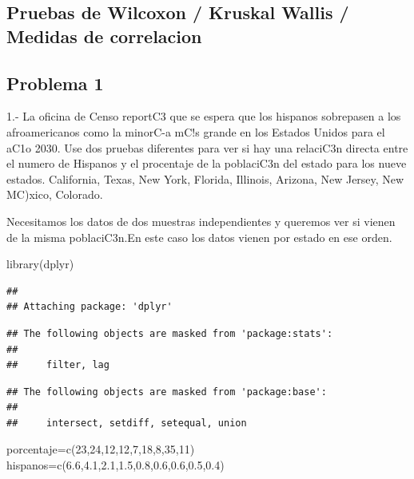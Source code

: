 \documentclass[
]{article}
\newenvironment{Shaded}{\begin{snugshade}}{\end{snugshade}}
\newcommand{\DecValTok}[1]{\textcolor[rgb]{0.00,0.00,0.81}{#1}}
\newcommand{\FloatTok}[1]{\textcolor[rgb]{0.00,0.00,0.81}{#1}}
\newcommand{\FunctionTok}[1]{\textcolor[rgb]{0.00,0.00,0.00}{#1}}
\newcommand{\NormalTok}[1]{#1}
\newcommand{\OtherTok}[1]{\textcolor[rgb]{0.56,0.35,0.01}{#1}}
\begin{document}
\hypertarget{pruebas-de-wilcoxon-kruskal-wallis-medidas-de-correlacion}{%
\subsection{Pruebas de Wilcoxon / Kruskal Wallis / Medidas de
correlacion}\label{pruebas-de-wilcoxon-kruskal-wallis-medidas-de-correlacion}}

\hypertarget{problema-1-1}{%
\subsection{Problema 1}\label{problema-1-1}}

1.- La oficina de Censo reportC3 que se espera que los hispanos
sobrepasen a los afroamericanos como la minorC-a mC!s grande en los
Estados Unidos para el aC1o 2030. Use dos pruebas diferentes para ver si
hay una relaciC3n directa entre el numero de Hispanos y el procentaje de
la poblaciC3n del estado para los nueve estados. California, Texas, New
York, Florida, Illinois, Arizona, New Jersey, New MC)xico, Colorado.

Necesitamos los datos de dos muestras independientes y queremos ver si
vienen de la misma poblaciC3n.En este caso los datos vienen por estado
en ese orden.

\begin{Shaded}
\begin{Highlighting}[]
\FunctionTok{library}\NormalTok{(dplyr)}
\end{Highlighting}
\end{Shaded}

\begin{verbatim}
## 
## Attaching package: 'dplyr'
\end{verbatim}

\begin{verbatim}
## The following objects are masked from 'package:stats':
## 
##     filter, lag
\end{verbatim}

\begin{verbatim}
## The following objects are masked from 'package:base':
## 
##     intersect, setdiff, setequal, union
\end{verbatim}

\begin{Shaded}
\begin{Highlighting}[]
\NormalTok{porcentaje}\OtherTok{=}\FunctionTok{c}\NormalTok{(}\DecValTok{23}\NormalTok{,}\DecValTok{24}\NormalTok{,}\DecValTok{12}\NormalTok{,}\DecValTok{12}\NormalTok{,}\DecValTok{7}\NormalTok{,}\DecValTok{18}\NormalTok{,}\DecValTok{8}\NormalTok{,}\DecValTok{35}\NormalTok{,}\DecValTok{11}\NormalTok{)}
\NormalTok{hispanos}\OtherTok{=}\FunctionTok{c}\NormalTok{(}\FloatTok{6.6}\NormalTok{,}\FloatTok{4.1}\NormalTok{,}\FloatTok{2.1}\NormalTok{,}\FloatTok{1.5}\NormalTok{,}\FloatTok{0.8}\NormalTok{,}\FloatTok{0.6}\NormalTok{,}\FloatTok{0.6}\NormalTok{,}\FloatTok{0.5}\NormalTok{,}\FloatTok{0.4}\NormalTok{)}
\end{Highlighting}
\end{Shaded}
\end{document}
